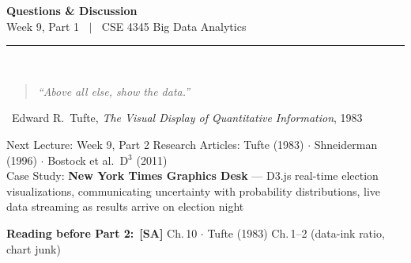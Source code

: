 \documentclass[aspectratio=169,10pt]{beamer}
\begin{document}
\begin{frame}[c]
  \begin{center}
    {\Large\bfseries Questions \& Discussion}\\[10pt]
    {\large Week 9, Part 1 $\;\mid\;$ CSE 4345 Big Data Analytics}\\[8pt]
    \textcolor{PUGray}{\rule{7cm}{0.5pt}}\\[10pt]
    \begin{quote}
      \itshape ``Above all else, show the data.''
    \end{quote}
    \hfill\textemdash\ Edward R.\ Tufte, \textit{The Visual Display of Quantitative Information}, 1983
    \vspace{12pt}
    \begin{block}{\centering Next Lecture: Week 9, Part 2}
      \centering
      Research Articles: Tufte (1983) $\cdot$ Shneiderman (1996) $\cdot$ Bostock et al.\ D$^3$ (2011)\\[4pt]
      \small Case Study: \textbf{New York Times Graphics Desk} ---
      D3.js real-time election visualizations, communicating uncertainty with probability distributions, live data streaming as results arrive on election night
    \end{block}
    \vspace{6pt}
    \textbf{Reading before Part 2:}\ \textbf{[SA]} Ch.\,10 $\cdot$ Tufte (1983) Ch.\,1--2 (data-ink ratio, chart junk)
  \end{center}
\end{frame}

\end{document}

